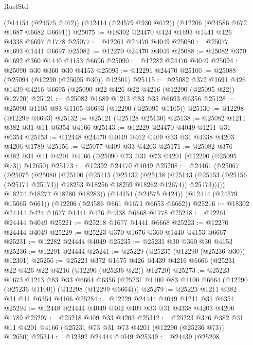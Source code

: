 \begin{lexlean}{RustStd}
\begin{coremodule}
    (@14154 (@24575 @462))
    (@12414 (@24579 @930 @672))
    (@12206 (@24586 @672 @1687 @6682 @6691))
@25075 := @18302 @24470 @424 @1693 @1441 @426 @4338 @6697 @1778
@25077 := @12261 @24470 @4049
@25080 := @25077 @1693 @1441 @6697
@25082 := @12270 @24470 @4049
@25088 := @25082 @370 @1692 @360 @1440 @4153 @6696
@25090 := @12282 @24470 @4049
@25094 := @25090 @30 @360 @30 @4153
@25095 := @12291 @24470
@25100 := @25088 (@25094 (@12290 (@25095 @30)) @12301)
@25115 := @25082
    @372
    @1691
    @426
    @1439
    @4216
    @6695
    (@25090 @22 @426 @22 @4216 (@12290 (@25095 @22)) @12720)
@25121 := @25082 @1689 @1213 @83 @33 @6693 @6356
@25128 := @25090 @1105 @83 @1105 @6693 (@12290 (@25095 @1105))
@25130 := @12298 (@12299 @6693)
@25132 := @25121 (@25128 @25130)
@25138 := @25082 @1211 @382 @31 @11 @6354 @4166
@25143 := @12229 @24470 @4049 @1211 @31 @6354
@25153 := @12448 @24470 @4049 @462 @409 @33 @31 @4338 @4203 @4206 @1789
@25156 := @25077 @409 @33 @4203
@25171 := @25082
    @376
    @382
    @31
    @11
    @4201
    @4166
    (@25090 @73 @31 @73 @4201 (@12290 (@25095 @73)) @12650)
@25173 := @12392 @24470 @4049
@25208 := @24461
    (@25067
      (@25075
        (@25080
          (@25100
            (@25115
              (@25132
                (@25138
                  (@25143 (@25153 (@25156 (@25171 @25173)) @18253 @18256 @18259 @18262 @12674))
                  @25173)))))
        @18274
        @18277
        @18280
        @18283))
    (@14154 (@24575 @424))
    (@12414 (@24579 @15065 @661))
    (@12206 (@24586 @661 @1671 @6653 @6662))
@25216 := @18302 @24444 @424 @1677 @1441 @426 @4338 @6668 @1778
@25218 := @12261 @24444 @4049
@25221 := @25218 @1677 @1441 @6668
@25223 := @12270 @24444 @4049
@25229 := @25223 @370 @1676 @360 @1440 @4153 @6667
@25231 := @12282 @24444 @4049
@25235 := @25231 @30 @360 @30 @4153
@25236 := @12291 @24444
@25241 := @25229 (@25235 (@12290 (@25236 @30)) @12301)
@25256 := @25223
    @372
    @1675
    @426
    @1439
    @4216
    @6666
    (@25231 @22 @426 @22 @4216 (@12290 (@25236 @22)) @12720)
@25273 := @25223
    @1673
    @1213
    @83
    @33
    @6664
    @6356
    (@25231 @1100 @83 @1100 @6664 (@12290 (@25236 @1100)) (@12298 (@12299 @6664)))
@25279 := @25223 @1211 @382 @31 @11 @6354 @4166
@25284 := @12229 @24444 @4049 @1211 @31 @6354
@25294 := @12448 @24444 @4049 @462 @409 @33 @31 @4338 @4203 @4206 @1789
@25297 := @25218 @409 @33 @4203
@25312 := @25223
    @376
    @382
    @31
    @11
    @4201
    @4166
    (@25231 @73 @31 @73 @4201 (@12290 (@25236 @73)) @12650)
@25314 := @12392 @24444 @4049
@25349 := @24439
    (@25208

\end{coremodule}
\end{lexlean}
